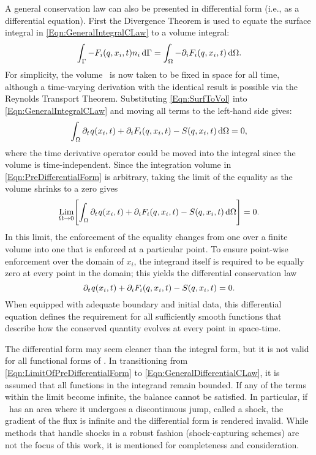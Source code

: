 \documentclass[12pt]{../UWMadThesis}
\begin{document}
A general conservation law can also be presented in differential form (i.e., as a differential equation).
First the Divergence Theorem is used to equate the surface integral in \cref{Eqn:GeneralIntegralCLaw} to a volume integral:
\begin{equation}
    \int_{\Gamma} -F_i(q,x_i,t) n_i\,\mathrm{d}{\Gamma} = \int_{\Omega} - \partial_i F_i(q,x_i,t) \,\mathrm{d}{\Omega}.
    \label{Eqn:SurfToVol}
\end{equation}
For simplicity, the volume \V\ is now taken to be fixed in space for all time, although a time-varying derivation with the identical result is possible via the Reynolds Transport Theorem.
Substituting \cref{Eqn:SurfToVol} into \cref{Eqn:GeneralIntegralCLaw} and moving all terms to the left-hand side gives:
\begin{equation}%
    \IntV \pdt\q(x_i,t) + \pdi F_i(\q,x_i,t) - S(\q,x_i,t) \dV = 0,
    \label{Eqn:PreDifferentialForm}
\end{equation}
where the time derivative operator could be moved into the integral since the volume is time-independent.
Since the integration volume in \cref{Eqn:PreDifferentialForm} is arbitrary, taking the limit of the equality as the volume shrinks to a zero gives
\begin{equation}%
    \Lim_{\V \rightarrow 0}\Biggl[\IntV \pdt\q(x_i,t) + \pdi F_i(\q,x_i,t) - S(\q,x_i,t) \dV \Biggr]= 0.
    \label{Eqn:LimitOfPreDifferentialForm}
\end{equation}
In this limit, the enforcement of the equality changes from one over a finite volume into one that is enforced at a particular point.
To ensure point-wise enforcement over the domain of $x_i$, the integrand itself is required to be equally zero at every point in the domain; this yields the differential conservation law
\begin{equation}
    \partial_t\:\!q(x_i,t) + \partial_i F_i(q,x_i,t) - S(q,x_i,t) = 0.
    \label{Eqn:GeneralDifferentialCLaw}
\end{equation}
When equipped with adequate boundary and initial data, this differential equation defines the requirement for all sufficiently smooth functions that describe how the conserved quantity evolves at every point in space-time.

The differential form may seem cleaner than the integral form, but it is not valid for all functional forms of \q.
In transitioning from \cref{Eqn:LimitOfPreDifferentialForm} to \cref{Eqn:GeneralDifferentialCLaw}, it is assumed that all functions in the integrand remain bounded.
If any of the terms within the limit become infinite, the balance cannot be satisfied.
In particular, if \q\ has an area where it undergoes a discontinuous jump, called a shock, the gradient of the flux is infinite and the differential form is rendered invalid.
While methods that handle shocks in a robust fashion (shock-capturing schemes) are not the focus of this work, it is mentioned for completeness and consideration.
\end{document}

